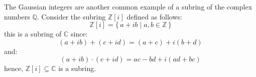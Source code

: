 \documentclass{article}                                                        %
\begin{document}
        \begin{example}
            The Gaussian integers are another common example of a subring of the
            complex numbers $\mathbb{Q}$. Consider the subring $\mathbb{Z}[i]$
            defined as follows:
            \begin{equation}
                \mathbb{Z}[i]=\{\,a+ib\;|\;a,b\in\mathbb{Z}\,\}
            \end{equation}
            this is a subring of $\mathbb{C}$ since:
            \begin{equation}
                (a+ib)+(c+id)=(a+c)+i(b+d)
            \end{equation}
            and:
            \begin{equation}
                (a+ib)\cdot(c+id)=ac-bd+i(ad+bc)
            \end{equation}
            hence, $\mathbb{Z}[i]\subseteq\mathbb{C}$ is a subring.
        \end{example}
\end{document}
